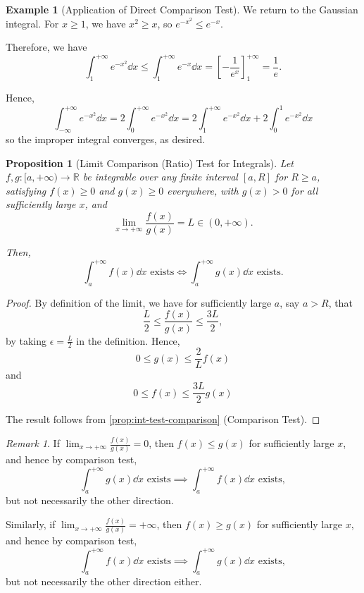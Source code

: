\documentclass[11pt]{article}
\numberwithin{equation}{section}
\newtheorem{proposition}[theorem]{Proposition}
\theoremstyle{definition}
\newtheorem{example}[theorem]{Example}
\theoremstyle{remark}
\newtheorem{remark}[theorem]{Remark}
\newcommand{\pqty}[1]{\left(#1\right)}
\newcommand{\bqty}[1]{\left[#1\right]}
\newcommand{\ccintv}[2]{[#1,#2]}
\newcommand{\oointv}[2]{(#1,#2)}
\newcommand{\cointv}[2]{[#1,#2)}
\newcommand{\functiondomain}[3]{#1:#2\to #3}
\newcommand{\RR}{\mathbb R}
\newcommand{\plusinfty}{+\infty}
\newcommand{\minusinfty}{-\infty}
\begin{document}
\begin{example}[Application of Direct Comparison Test]\label{analysis-unit-0185}
    \label{ex:app-direct-comparison-test}%
    We return to the Gaussian integral. For \(x \geq 1\), we have \(x^2 \geq x\), so \(e^{-x^2} \leq e^{-x}\).

    Therefore, we have
    \[
        \int_{1}^{\plusinfty} e^{-x^2} \dd{x} \leq \int_{1}^{\plusinfty} e^{-x} \dd{x} = \bqty{- \frac{1}{e^x}}^{\plusinfty}_{1} = \frac{1}{e}.
    \]

    Hence,
    \[
        \int_{\minusinfty}^{\plusinfty} e^{-x^2} \dd{x} = 2 \int_{0}^{\plusinfty} e^{-x^2} \dd{x} = 2 \int_{1}^{\plusinfty} e^{-x^2} \dd{x} + 2 \int_{0}^{1} e^{-x^2} \dd{x}
    \]
    so the improper integral converges, as desired.
\end{example}

\begin{proposition}[Limit Comparison (Ratio) Test for Integrals]\label{analysis-unit-0186}
    \label{prop:int-test-ratio}%
    Let \(\functiondomain{f, g}{\cointv{a}{\plusinfty}}{\RR}\) be integrable over any finite interval \(\ccintv{a}{R}\) for \(R \geq a\), satisfying \(f(x)\ge0\) and \(g(x)\ge0\) everywhere, with \(g(x)>0\) for all sufficiently large \(x\), and
    \[
        \lim_{x \to \plusinfty} \frac{f\pqty{x}}{g\pqty{x}} = L \in \oointv{0}{\plusinfty}.
    \]

    Then,
    \[
        \int_{a}^{\plusinfty} f\pqty{x} \dd{x} \text{ exists} \iff \int_{a}^{\plusinfty} g\pqty{x} \dd{x} \text{ exists}.
    \]
\end{proposition}

\begin{proof}
    By definition of the limit, we have for sufficiently large \(a\), say \(a > R\), that
    \[
        \frac{L}{2} \leq \frac{f\pqty{x}}{g\pqty{x}} \leq \frac{3L}{2},
    \]
    by taking \(\epsilon = \frac{L}{2}\) in the definition. Hence,
    \[
        0 \leq g\pqty{x} \leq \frac{2}{L} f\pqty{x}
    \]
    and
    \[
        0 \leq f\pqty{x} \leq \frac{3L}{2} g\pqty{x}
    \]

    The result follows from \autoref{prop:int-test-comparison} (Comparison Test).
\end{proof}

\begin{remark}\label{analysis-unit-0187}
    If \(\lim_{x \to \plusinfty} \frac{f\pqty{x}}{g\pqty{x}} = 0\), then \(f\pqty{x} \leq g\pqty{x}\) for sufficiently large \(x\), and hence by comparison test,
    \[
        \int_{a}^{\plusinfty} g\pqty{x} \dd{x} \text{ exists} \implies \int_{a}^{\plusinfty} f\pqty{x} \dd{x} \text{ exists},
    \]
    but not necessarily the other direction.

    Similarly, if \(\lim_{x \to \plusinfty} \frac{f\pqty{x}}{g\pqty{x}} = \plusinfty\), then \(f\pqty{x} \geq g\pqty{x}\) for sufficiently large \(x\), and hence by comparison test,
    \[
        \int_{a}^{\plusinfty} f\pqty{x} \dd{x} \text{ exists} \implies \int_{a}^{\plusinfty} g\pqty{x} \dd{x} \text{ exists},
    \]
    but not necessarily the other direction either.
\end{remark}
\end{document}
